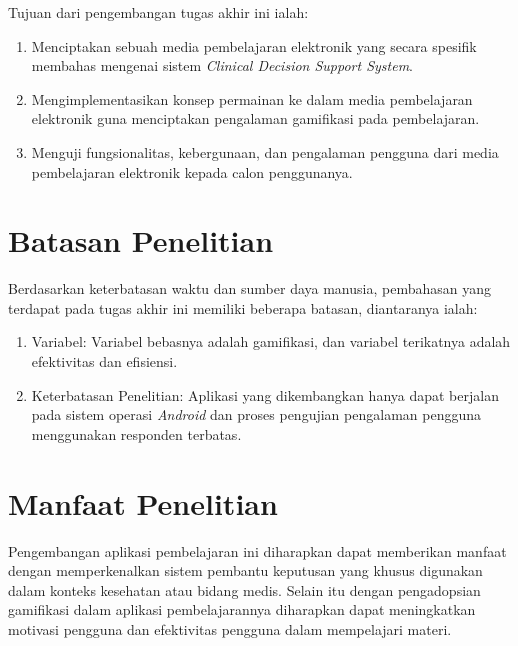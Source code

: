 Tujuan dari pengembangan tugas akhir ini ialah:
\begin{enumerate}
	\item Menciptakan sebuah media pembelajaran elektronik yang secara spesifik membahas mengenai sistem \textit{Clinical Decision Support System}.
	\item Mengimplementasikan konsep permainan ke dalam media pembelajaran elektronik guna menciptakan pengalaman gamifikasi pada pembelajaran.
	\item Menguji fungsionalitas, kebergunaan, dan pengalaman pengguna dari media pembelajaran elektronik kepada calon penggunanya.
\end{enumerate}

\section{Batasan Penelitian}
Berdasarkan keterbatasan waktu dan sumber daya manusia, pembahasan yang terdapat pada tugas akhir ini memiliki beberapa batasan, diantaranya ialah:
\begin{enumerate}
\item Variabel: Variabel bebasnya adalah gamifikasi, dan variabel terikatnya adalah efektivitas dan efisiensi.
\item Keterbatasan Penelitian: Aplikasi yang dikembangkan hanya dapat berjalan pada sistem operasi \textit{Android} dan proses pengujian pengalaman pengguna menggunakan responden terbatas.
\end{enumerate}

\section{Manfaat Penelitian}
Pengembangan aplikasi pembelajaran ini diharapkan dapat memberikan manfaat dengan memperkenalkan sistem pembantu keputusan yang khusus digunakan dalam konteks kesehatan atau bidang medis.
Selain itu dengan pengadopsian gamifikasi dalam aplikasi pembelajarannya diharapkan dapat meningkatkan motivasi pengguna dan efektivitas pengguna dalam mempelajari materi.
